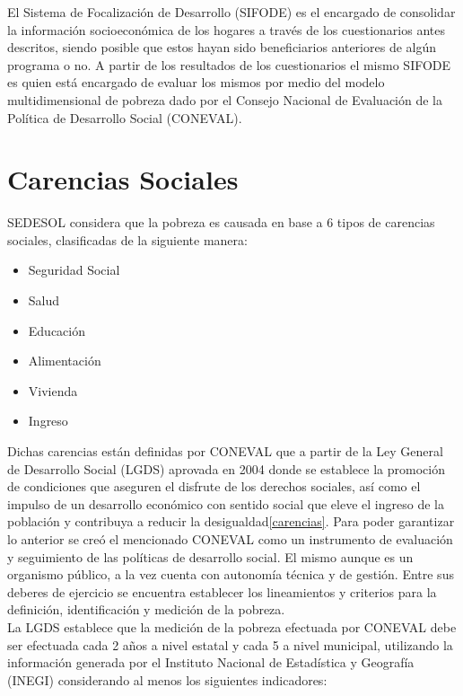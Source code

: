 El Sistema de Focalización de Desarrollo (SIFODE) es el encargado de consolidar la información socioeconómica de los hogares a través de los cuestionarios antes descritos, siendo posible que estos hayan sido beneficiarios anteriores de algún programa o no. A partir de los resultados de los cuestionarios el mismo SIFODE es quien está encargado de evaluar los mismos por medio del modelo multidimensional de pobreza dado por el Consejo Nacional de Evaluación de la Política de Desarrollo Social (CONEVAL)\cite{multidimensional}.\\

\section{Carencias Sociales}
SEDESOL considera que la pobreza es causada en base a 6 tipos de carencias sociales, clasificadas de la siguiente manera:\\
\begin{itemize}
    \item Seguridad Social
    \item Salud
    \item Educación
    \item Alimentación
    \item Vivienda
    \item Ingreso
\end{itemize}
Dichas carencias están definidas por CONEVAL\cite{coneval} que a partir de la Ley General de Desarrollo Social (LGDS) aprovada en 2004 donde se establece la promoción de condiciones que aseguren el disfrute de los derechos sociales, así como el impulso de un desarrollo económico con sentido social que eleve el ingreso de la población y contribuya a reducir la desigualdad\ref{carencias}. Para poder garantizar lo anterior se creó el mencionado CONEVAL como un instrumento de evaluación y seguimiento de las políticas de desarrollo social. El mismo aunque es un organismo público, a la vez cuenta con autonomía técnica y de gestión. Entre sus deberes de ejercicio se encuentra establecer los lineamientos y criterios para la definición, identificación y medición de la pobreza.\\
La LGDS establece que la medición de la pobreza efectuada por CONEVAL debe ser efectuada cada 2 años a nivel estatal y cada 5 a nivel municipal, utilizando la información generada por el Instituto Nacional de Estadística y Geografía (INEGI)\cite{inegi} considerando al menos los siguientes indicadores:\\
